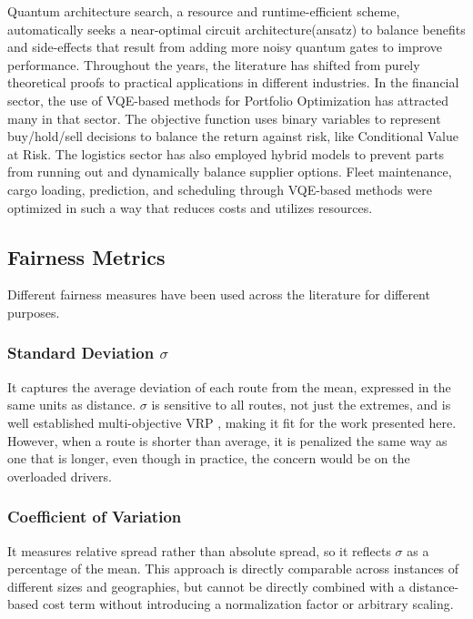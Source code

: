 \documentclass[a4paper]{report}
\begin{document}
{\begin{itemize}
\newline
Quantum architecture search, a resource and runtime-efficient scheme, automatically seeks a near-optimal circuit architecture(ansatz) to balance benefits and side-effects that result from adding more noisy quantum gates to improve performance\cite{qarchsearch}.
\newline
Throughout the years, the literature has shifted from purely theoretical proofs to practical applications in different industries. In the financial sector, the use of VQE-based methods for Portfolio Optimization has attracted many in that sector. The objective function uses binary variables to represent buy/hold/sell decisions to balance the return against risk, like Conditional Value at Risk\cite{portfolioptim}.
\newline
The logistics sector has also employed hybrid models to prevent parts from running out and dynamically balance supplier options. Fleet maintenance, cargo loading, prediction, and scheduling through VQE-based methods were optimized in such a way that reduces costs and utilizes resources\cite{logisticsvqe}.

\subsection{Fairness Metrics}
Different fairness measures have been used across the literature for different purposes.

\subsubsection{Standard Deviation $\sigma$}
It captures the average deviation of each route from the mean, expressed in the same units as distance. $\sigma$ is sensitive to all routes, not just the extremes, and is well established multi-objective VRP \cite{standardDev}, making it fit for the work presented here. 
However, when a route is shorter than average, it is penalized the same way as one that is longer, even though in practice, the concern would be on the overloaded drivers.

\subsubsection{Coefficient of Variation}
It measures relative spread rather than absolute spread, so it reflects $\sigma$ as a percentage of the mean.
This approach is directly comparable across instances of different sizes and geographies, but cannot be directly combined with a distance-based cost term without introducing a normalization factor or arbitrary scaling\cite{cv}.


\end{itemize}}
\end{document}
